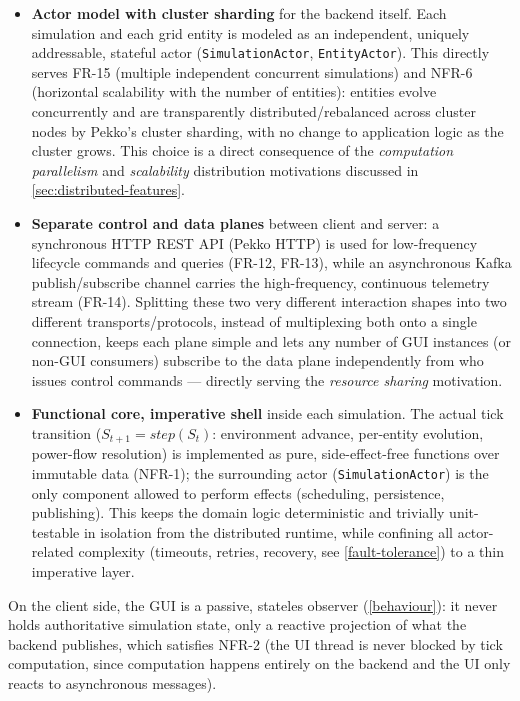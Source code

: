\documentclass{scrreprt}
\begin{document}
\begin{itemize}
  \item \textbf{Actor model with cluster sharding} for the backend itself. Each simulation
  and each grid entity is modeled as an independent, uniquely addressable, stateful actor
  (\texttt{SimulationActor}, \texttt{EntityActor}). This directly serves \textsc{FR-15} (multiple independent
  concurrent simulations) and \textsc{NFR-6} (horizontal scalability with the number of
  entities): entities evolve concurrently and are transparently distributed/rebalanced across
  cluster nodes by Pekko's cluster sharding, with no change to application logic as the
  cluster grows. This choice is a direct consequence of the \emph{computation
  parallelism} and \emph{scalability} distribution motivations discussed in
  \cref{sec:distributed-features}.
  \item \textbf{Separate control and data planes} between client and server: a synchronous
  HTTP REST API (Pekko HTTP) is used for low-frequency lifecycle commands and queries
  (\textsc{FR-12}, \textsc{FR-13}), while an asynchronous Kafka publish/subscribe channel
  carries the high-frequency, continuous telemetry stream (\textsc{FR-14}). Splitting these
  two very different interaction shapes into two different transports/protocols, instead of
  multiplexing both onto a single connection, keeps each plane simple and lets any number of
  GUI instances (or non-GUI consumers) subscribe to the data plane independently from who
  issues control commands --- directly serving the \emph{resource sharing} motivation.
  \item \textbf{Functional core, imperative shell} inside each simulation. The actual tick
  transition ($S_{t+1} = \mathit{step}(S_t)$: environment advance, per-entity evolution,
  power-flow resolution) is implemented as pure, side-effect-free functions over immutable
  data (\textsc{NFR-1}); the surrounding actor (\texttt{SimulationActor}) is the only
  component allowed to perform effects (scheduling, persistence, publishing). This keeps the
  domain logic deterministic and trivially unit-testable in isolation from the distributed
  runtime, while confining all actor-related complexity (timeouts, retries, recovery, see
  \cref{fault-tolerance}) to a thin imperative layer.
\end{itemize}

On the client side, the GUI is a passive, stateles observer
(\cref{behaviour}): it never holds authoritative simulation state, only a reactive projection
of what the backend publishes, which satisfies \textsc{NFR-2} (the UI thread is never blocked
by tick computation, since computation happens entirely on the backend and the UI only reacts
to asynchronous messages).
\end{document}
